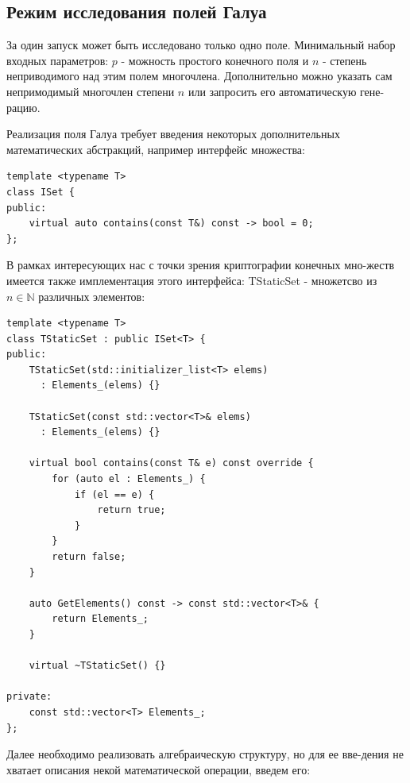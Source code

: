 \documentclass[a4paper]{article}
\newenvironment{code}{\captionsetup{type=listing}}{}
\begin{document}
  \subsection{Режим исследования полей Галуа}

  За один запуск может быть исследовано только одно поле. Минимальный набор
  входных параметров: $p$ - можность простого конечного поля и $n$ - степень неприводимого над этим полем многочлена.
  Дополнительно можно указать сам непримодимый многочлен степени $n$ или запросить его автоматическую гене-рацию.

  Реализация поля Галуа требует введения некоторых дополнительных математических абстракций, например интерфейс множества:
\begin{code}
\begin{verbatim}
template <typename T>
class ISet {
public:
    virtual auto contains(const T&) const -> bool = 0;
};
\end{verbatim}
\end{code}

В рамках интересующих нас с точки зрения криптографии конечных мно-жеств имеется также имплементация
этого интерфейса: TStaticSet - множетсво из $n \in \mathbb{N}$ различных элементов:

\begin{code}
\begin{verbatim}
template <typename T>
class TStaticSet : public ISet<T> {
public:
    TStaticSet(std::initializer_list<T> elems)
      : Elements_(elems) {}
  
    TStaticSet(const std::vector<T>& elems)
      : Elements_(elems) {}
  
    virtual bool contains(const T& e) const override {
        for (auto el : Elements_) {
            if (el == e) {
                return true;
            }
        }
        return false;
    }
  
    auto GetElements() const -> const std::vector<T>& {
        return Elements_;
    }
  
    virtual ~TStaticSet() {}
  
private:
    const std::vector<T> Elements_;
};
\end{verbatim}
\end{code}

Далее необходимо реализовать алгебраическую структуру, но для ее вве-дения не хватает описания некой математической операции, введем его:
\end{document}
